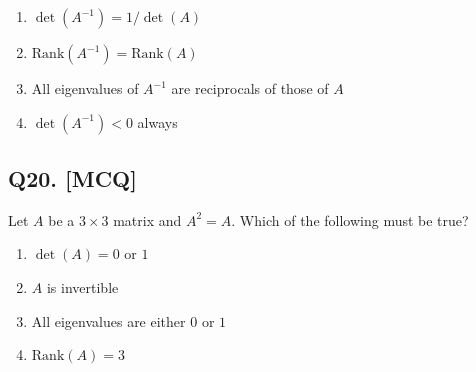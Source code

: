 \begin{enumerate}[label=(\alph*)]
    \item $\det(A^{-1}) = 1/\det(A)$ 
    \item $\text{Rank}(A^{-1}) = \text{Rank}(A)$ 
    \item All eigenvalues of $A^{-1}$ are reciprocals of those of $A$ 
    \item $\det(A^{-1}) < 0$ always
\end{enumerate}

\subsection*{Q20. [MCQ]}
Let $A$ be a $3 \times 3$ matrix and $A^2 = A$. Which of the following must be true?

\begin{enumerate}[label=(\alph*)]
    \item $\det(A) = 0$ or $1$
    \item $A$ is invertible  
    \item All eigenvalues are either $0$ or $1$ 
    \item $\text{Rank}(A) = 3$
\end{enumerate}


